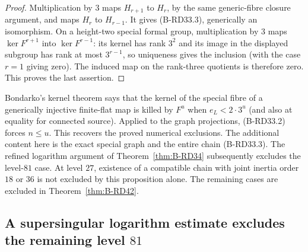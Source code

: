 \begin{proof}
Multiplication by $3$ maps $H_{r+1}$ to $H_r$, by the
same generic-fibre closure argument, and maps $H_r$ to
$H_{r-1}$. It gives (B-RD33.3), generically an isomorphism.
On a height-two special formal group, multiplication by
$3$ maps $\ker F^{r+1}$ into $\ker F^{r-1}$: its kernel
has rank $3^2$ and its image in the displayed subgroup
has rank at most $3^{r-1}$, so uniqueness gives the
inclusion (with the case $r=1$ giving zero). The induced
map on the rank-three quotients is therefore zero.
This proves the last assertion.
\end{proof}

\begin{remark}\label{auto:B:18f97bffbcfd}

Bondarko's kernel theorem
\cite[Theorem~5, printed pp.~681--682]{Bondarko2006Generic}
says that the kernel of the special fibre of a generically
injective finite-flat map is killed by $F^u$ when
$e_L<2\cdot3^u$ (and also at equality for connected source).
Applied to the graph projections, (B-RD33.2) forces
$n\le u$. This recovers the proved numerical exclusions.
The additional content here is the exact special graph
and the entire chain (B-RD33.3). The refined logarithm argument
of Theorem~\ref{thm:B-RD34} subsequently excludes the
level-$81$ case. At level $27$, existence of a compatible
chain with joint inertia order $18$ or $36$ is not excluded by this proposition alone.
The remaining cases are excluded in Theorem~\ref{thm:B-RD42}.
\end{remark}


\subsection{A supersingular logarithm estimate excludes the remaining level $81$}


